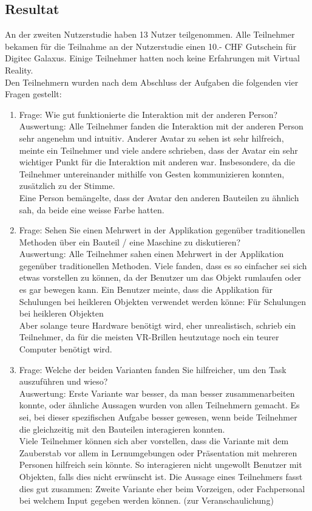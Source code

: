 \subsection{Resultat}
An der zweiten Nutzerstudie haben 13 Nutzer teilgenommen. Alle Teilnehmer bekamen für die Teilnahme an der Nutzerstudie einen 10.- CHF Gutschein für Digitec Galaxus. Einige Teilnehmer hatten noch keine Erfahrungen mit Virtual Reality. \\

\noindent Den Teilnehmern wurden nach dem Abschluss der Aufgaben die folgenden vier Fragen gestellt:

\begin{enumerate} [itemsep=1pt,topsep=0pt]
	\item Frage: Wie gut funktionierte die Interaktion mit der anderen Person? \\
	Auswertung: Alle Teilnehmer fanden die Interaktion mit der anderen Person sehr angenehm und intuitiv. \grqq Anderer Avatar zu sehen ist sehr hilfreich\grqq{}, meinte ein Teilnehmer und viele andere schrieben, dass der Avatar ein sehr wichtiger Punkt für die Interaktion mit anderen war. Insbesondere, da die Teilnehmer untereinander mithilfe von Gesten kommunizieren konnten, zusätzlich zu der Stimme.  \\
	Eine Person bemängelte, dass der Avatar den anderen Bauteilen zu ähnlich sah, da beide eine weisse Farbe hatten.
	\item Frage: Sehen Sie einen Mehrwert in der Applikation gegenüber traditionellen Methoden über ein Bauteil / eine Maschine zu diskutieren? \\
	Auswertung: Alle Teilnehmer sahen einen Mehrwert in der Applikation gegenüber traditionellen Methoden. Viele fanden, dass es so einfacher sei sich etwas vorstellen zu können, da der Benutzer um das Objekt rumlaufen oder es gar bewegen kann. Ein Benutzer meinte, dass die Applikation für Schulungen bei heikleren Objekten verwendet werden könne: \grqq Für Schulungen bei heikleren Objekten\grqq{}\\
	\grqq Aber solange teure Hardware benötigt wird, eher unrealistisch\grqq{}, schrieb ein Teilnehmer, da für die meisten VR-Brillen heutzutage noch ein teurer Computer benötigt wird.

	\item Frage: Welche der beiden Varianten fanden Sie hilfreicher, um den Task auszuführen und wieso? \\
	Auswertung: \grqq Erste Variante war besser, da man besser zusammenarbeiten konnte\grqq{}, oder ähnliche Aussagen wurden von allen Teilnehmern gemacht. Es sei, bei dieser spezifischen Aufgabe besser gewesen, wenn beide Teilnehmer die gleichzeitig mit den Bauteilen interagieren konnten.\\
	Viele Teilnehmer können sich aber vorstellen, dass die Variante mit dem Zauberstab vor allem in Lernumgebungen oder Präsentation mit mehreren Personen hilfreich sein könnte. So interagieren nicht ungewollt Benutzer mit Objekten, falls dies nicht erwünscht ist. Die Aussage eines Teilnehmers fasst dies gut zusammen: \grqq Zweite Variante eher beim Vorzeigen, oder Fachpersonal bei welchem Input gegeben werden können. (zur Veranschaulichung)\grqq{} 
	

\end{enumerate}
